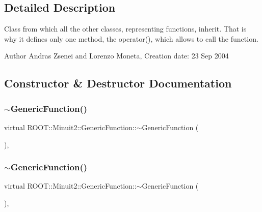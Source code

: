 \subsection{Detailed Description}
Class from which all the other classes, representing functions, inherit. That is why it defines only one method, the operator(), which allows to call the function.

\begin{DoxyAuthor}{Author}
Andras Zsenei and Lorenzo Moneta, Creation date\+: 23 Sep 2004 
\end{DoxyAuthor}


\subsection{Constructor \& Destructor Documentation}
\mbox{\label{classROOT_1_1Minuit2_1_1GenericFunction_ac1d198b822e43d3936286cc580c3e035}} 
\subsubsection{\texorpdfstring{$\sim$GenericFunction()}{~GenericFunction()}\hspace{0.1cm}{\footnotesize\ttfamily [1/2]}}
{\footnotesize\ttfamily virtual R\+O\+O\+T\+::\+Minuit2\+::\+Generic\+Function\+::$\sim$\+Generic\+Function (\begin{DoxyParamCaption}{ }\end{DoxyParamCaption})\hspace{0.3cm}{\ttfamily [inline]}, {\ttfamily [virtual]}}

\mbox{\label{classROOT_1_1Minuit2_1_1GenericFunction_ac1d198b822e43d3936286cc580c3e035}} 
\subsubsection{\texorpdfstring{$\sim$GenericFunction()}{~GenericFunction()}\hspace{0.1cm}{\footnotesize\ttfamily [2/2]}}
{\footnotesize\ttfamily virtual R\+O\+O\+T\+::\+Minuit2\+::\+Generic\+Function\+::$\sim$\+Generic\+Function (\begin{DoxyParamCaption}{ }\end{DoxyParamCaption})\hspace{0.3cm}{\ttfamily [inline]}, {\ttfamily [virtual]}}



